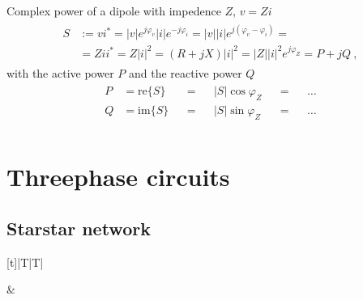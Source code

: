 \documentclass[letterpaper,10pt,english]{jupyterBook}
\begin{document}
\sphinxAtStartPar
{} Complex power of a dipole with impedence \(Z\), \(v =  Z i\)
\begin{equation*}
\begin{split}\begin{aligned}
  S 
  & := v i^* = |v|e^{j \varphi_v} |i| e^{-j \varphi_i} = |v| |i| e^{j(\varphi_v - \varphi_i)} = \\
  & = Z i i^* = Z |i|^2 = (R + j X ) |i|^2 = |Z||i|^2 e^{j \varphi_Z} = P + j Q \ ,
\end{aligned}\end{split}
\end{equation*}
\sphinxAtStartPar
with the active power \(P\) and the reactive power \(Q\)
\begin{equation*}
\begin{split}\begin{aligned}
  P & = \text{re}\{ S \} && = && |S| \cos \varphi_Z && = && \dots \\
  Q & = \text{im}\{ S \} && = && |S| \sin \varphi_Z && = && \dots \\
\end{aligned}\end{split}
\end{equation*}


\sphinxstepscope


\section{Three\sphinxhyphen{}phase circuits}
\label{\detokenize{ch/electrical-engineering-three-phase:three-phase-circuits}}\label{\detokenize{ch/electrical-engineering-three-phase:classical-electromagnetism-electrical-engineering-three-phase}}\label{\detokenize{ch/electrical-engineering-three-phase::doc}}

\subsection{Star\sphinxhyphen{}star network}
\label{\detokenize{ch/electrical-engineering-three-phase:star-star-network}}\label{\detokenize{ch/electrical-engineering-three-phase:classical-electromagnetism-electrical-engineering-three-phase-star-star}}

\begin{savenotes}\sphinxattablestart
\centering
\begin{tabulary}{\linewidth}[t]{|T|T|}
\hline

\sphinxAtStartPar
{}
&
\sphinxAtStartPar
{}
\\
\hline
\end{tabulary}
\par
\sphinxattableend\end{savenotes}
\end{document}
